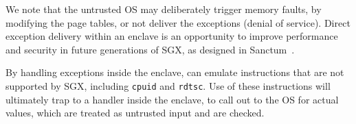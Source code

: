 We note that the untrusted OS may deliberately trigger memory faults, %
by modifying the page tables,
or not deliver the exceptions (denial of service).
Direct exception delivery within an enclave %
is an opportunity to improve performance and security in future generations of SGX,
as designed in Sanctum~\cite{costan2016sanctum}.



By handling exceptions inside the enclave, \graphenesgx{}can emulate instructions that are not supported by SGX, including {\tt cpuid} and {\tt rdtsc}.
Use of these instructions will ultimately trap to a handler inside the enclave,
to call out to the OS for actual values, which are treated as untrusted input and are checked.



